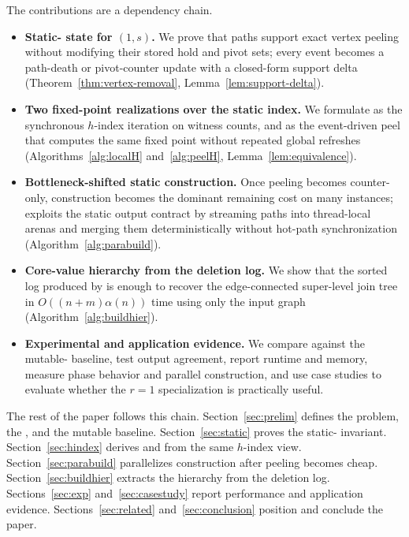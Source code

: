 The contributions are a dependency chain.
\begin{itemize}[leftmargin=1.3em,itemsep=1pt,topsep=2pt]
\item \textbf{Static-\cpi{} state for \((1,s)\).} We prove that \cpi{} paths support exact vertex peeling without modifying their stored hold and pivot sets; every event becomes a path-death or pivot-counter update with a closed-form support delta (Theorem~\ref{thm:vertex-removal}, Lemma~\ref{lem:support-delta}).
\item \textbf{Two fixed-point realizations over the static index.} We formulate \localH{} as the synchronous \(h\)-index iteration on \cpi{} witness counts, and \peelH{} as the event-driven peel that computes the same fixed point without repeated global refreshes (Algorithms~\ref{alg:localH} and~\ref{alg:peelH}, Lemma~\ref{lem:equivalence}).
\item \textbf{Bottleneck-shifted static construction.} Once peeling becomes counter-only, \cpi{} construction becomes the dominant remaining cost on many instances; \paraBuild{} exploits the static output contract by streaming paths into thread-local arenas and merging them deterministically without hot-path synchronization (Algorithm~\ref{alg:parabuild}).
\item \textbf{Core-value hierarchy from the deletion log.} We show that the sorted log produced by \peelH{} is enough to recover the edge-connected super-level join tree in \(O((n+m)\alpha(n))\) time using only the input graph (Algorithm~\ref{alg:buildhier}).
\item \textbf{Experimental and application evidence.} We compare against the mutable-\cpi{} baseline, test output agreement, report runtime and memory, measure phase behavior and parallel construction, and use case studies to evaluate whether the \(r=1\) specialization is practically useful.
\end{itemize}

The rest of the paper follows this chain.
%
Section~\ref{sec:prelim} defines the problem, the \cpi{}, and the mutable baseline.
%
Section~\ref{sec:static} proves the static-\cpi{} invariant.
%
Section~\ref{sec:hindex} derives \localH{} and \peelH{} from the same \(h\)-index view.
%
Section~\ref{sec:parabuild} parallelizes construction after peeling becomes cheap.
%
Section~\ref{sec:buildhier} extracts the hierarchy from the deletion log.
%
Sections~\ref{sec:exp} and~\ref{sec:casestudy} report performance and application evidence.
%
Sections~\ref{sec:related} and~\ref{sec:conclusion} position and conclude the paper.
